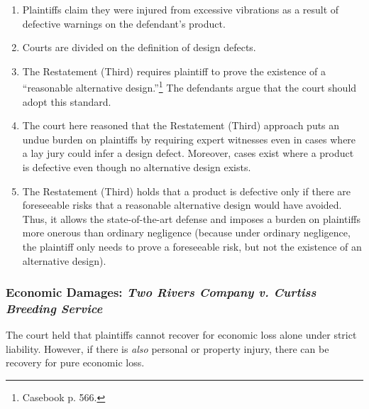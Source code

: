 \begin{enumerate}
    \item Plaintiffs claim they were injured from excessive vibrations as a 
    result of defective warnings on the defendant's product.
    \item Courts are divided on the definition of design defects.
    \item The Restatement (Third) requires plaintiff to prove the existence of a 
    ``reasonable alternative design.''\footnote{Casebook p. 566.} The defendants 
    argue that the court should adopt this standard.
    \item The court here reasoned that the Restatement (Third) approach puts an 
    undue burden on plaintiffs by requiring expert witnesses even in cases where 
    a lay jury could infer a design defect. Moreover, cases exist where a 
    product is defective even though no alternative design exists.
    \item The Restatement (Third) holds that a product is defective only if 
    there are foreseeable risks that a reasonable alternative design would have 
    avoided. Thus, it allows the state-of-the-art defense and imposes a burden 
    on plaintiffs more onerous than ordinary negligence (because under ordinary 
    negligence, the plaintiff only needs to prove a foreseeable risk, but not 
    the existence of an alternative design).
\end{enumerate}

\subsubsection{Economic Damages: \emph{Two Rivers Company v. Curtiss Breeding 
Service}}

The court held that plaintiffs cannot recover for economic loss alone under 
strict liability. However, if there is \emph{also} personal or property 
injury, there can be recovery for pure economic loss.

